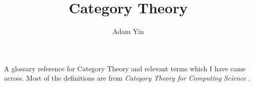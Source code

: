 \documentclass[a4paper]{article}
\title{Category Theory}
\author{Adam Yin}
\date{}
\begin{document}
\maketitle
A glossary reference for Category Theory and relevant terms which I have
came across. Most of the definitions are from \textit{Category Theory for
Computing Science} \cite{ctforcpsc}.

\clearpage

\glsaddall
{}
\printglossaries

\medskip



\end{document}
